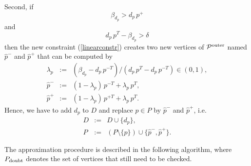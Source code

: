 \documentclass[12pt]{article}
\begin{document}
Second, if 
\begin{equation}\label{betagreater}
\beta_{d_p} > d_p\, p^+
\end{equation}
and
\begin{equation}\label{greaterdelta}
d_{p}\, p^T - \beta_{d_{p}} > \delta
\end{equation}
then the new constraint (\ref{linearconstr}) creates two new vertices of ${\cal P}^{\rm outer}$ named $\hat p^-$ and $\hat p^+$ that can be computed by
\begin{equation}\label{def_hatp}
\begin{array}{lcl}
\lambda_p &:=& (\beta_{d_p} - d_p\, p^{-T})/(d_p\, p^T - d_p\, p^{-T}) \in (0, 1), \\
\hat p^- &:=& (1 - \lambda_p)\, p^{-T} + \lambda_p\, p^T, \\
\hat p^+ &:=& (1 - \lambda_p)\, p^{+T} + \lambda_p\, p^T.
\end{array}
\end{equation}
Hence, we have to add $d_p$ to $D$ and replace $p \in P$ by $\hat p^-$ and $\hat p^+$, i.e.
\begin{equation}\label{newDP1}
\begin{array}{lcl}
D &:=& D \cup \{d_{p}\}, \\
P &:=&(P \setminus \{p\}) \cup \{\hat p^-, \hat p^+\}.
\end{array}
\end{equation}

The approximation procedure is described in the following algorithm, where $P_{\rm doubt}$ denotes the set of vertices that still need to be checked.
\end{document}
